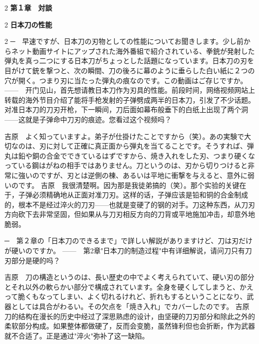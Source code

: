 \documentclass[12pt,UTF8]{ctexbook}
\begin{document}
\mainmatter



\begin{paracol}{2}
{\LARGE\bfseries 第１章　対談}
\end{paracol}
\vspace{0.8em}

\begin{paracol}{2}
{\large\bfseries 日本刀の性能}
\end{paracol}

\vspace{0.5em}

\begin{paracol}{2}
─　早速ですが、日本刀の刃物としての性能についてお聞きします。少し前からネット動画サイトにアップされた海外番組で紹介されている、拳銃が発射した弾丸を真っ二つにする日本刀がちょっとした話題になっています。日本刀の刃を目がけて銃を撃つと、次の瞬間、刀の後ろに幕のように垂らした白い紙に２つの穴が開く。つまり刃に当たった弾丸の痕なのです。この動画はご存じですか。
\switchcolumn*
——　开门见山，首先想请教日本刀作为刃具的性能。前段时间，网络视频网站上转载的海外节目介绍了能将手枪发射的子弹劈成两半的日本刀，引发了不少话题。对准日本刀的刀刃开枪，下一瞬间，刀后面如幕布般垂下的白纸上出现了两个洞——这就是子弹命中刀刃的痕迹。您看过这个视频吗？
\switchcolumn*

吉原　よく知っていますよ。弟子が仕掛けたことですから（笑）。あの実験で大切なのは、刃に対して正確に真正面から弾丸を当てることです。そうすれば、弾丸は鉛や銅の合金でできているはずですから、焼き入れをした刃、つまり硬くなっている鋼はがねの相手ではありません。刀というのは、刃から切りつけると非常に強いのですが、刃とは逆側の棟、あるいは平地に衝撃を与えると、意外に弱いのです。
\switchcolumn*
吉原　我很清楚啊。因为那是我徒弟搞的（笑）。那个实验的关键在于，子弹必须精确地从正面对准刀刃。这样的话，子弹应该是铅和铜的合金制成的，根本不是经过淬火的刀刃——也就是变硬了的钢的对手。刀这种东西，从刀刃方向砍下去非常坚固，但如果从与刀刃相反方向的刀背或平地施加冲击，却意外地脆弱。
\switchcolumn*

─　第２章の「日本刀のできるまで」で詳しい解説がありますけど、刀は刃だけが硬いのですか。
\switchcolumn*
——　第2章"日本刀的制造过程"中有详细解说，请问刀只有刀刃部分是硬的吗？
\switchcolumn*

吉原　刀の構造というのは、長い歴史の中でよく考えられていて、硬い刃の部分とそれ以外の軟らかい部分で構成されています。全身を硬くしてしまうと、かえって脆くもなってしまい、よく切れるけれど、折れもするということになり、武器としては具合がわるい。その欠点を「焼き入れ」でカバーしたのです。
\switchcolumn*
吉原　刀的结构在漫长的历史中经过了深思熟虑的设计，由坚硬的刀刃部分和除此之外的柔软部分构成。如果整体都做硬了，反而会变脆，虽然锋利但也会折断，作为武器就不合适了。正是通过"淬火"弥补了这一缺陷。
\switchcolumn*


\end{paracol}
\end{document}
